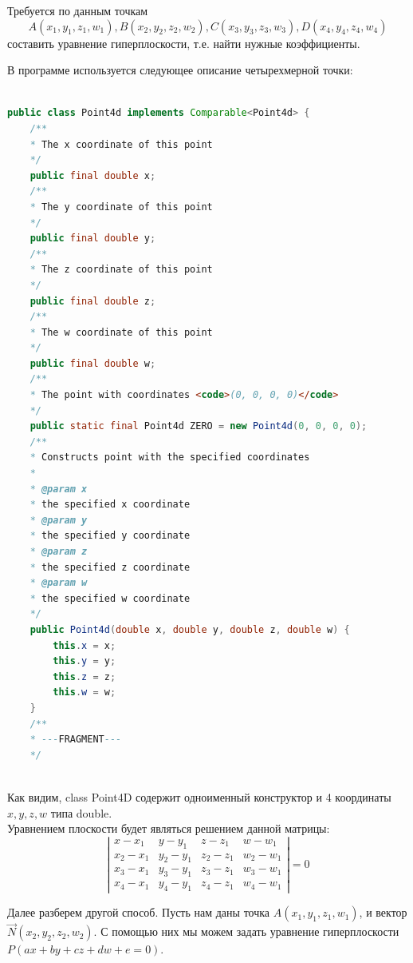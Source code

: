 \documentclass[12pt, a4paper, twoside]{report}
\begin{document}
Требуется по данным точкам $$A(x_1,y_1,z_1,w_1), B(x_2,y_2,z_2,w_2), C(x_3,y_3,z_3,w_3), D(x_4,y_4,z_4,w_4)$$ составить уравнение гиперплоскости, т.е. найти нужные коэффициенты.

В программе используется следующее описание четырехмерной точки:
\begin{lstlisting}[language=Java, basicstyle=\small]

public class Point4d implements Comparable<Point4d> {
	/**
	* The x coordinate of this point
	*/
	public final double x;
	/**
	* The y coordinate of this point
	*/
	public final double y;
	/**
	* The z coordinate of this point
	*/
	public final double z;
	/**
	* The w coordinate of this point
	*/
	public final double w;
	/**
	* The point with coordinates <code>(0, 0, 0, 0)</code>
	*/
	public static final Point4d ZERO = new Point4d(0, 0, 0, 0);
	/**
	* Constructs point with the specified coordinates
	*
	* @param x
	* the specified x coordinate
	* @param y
	* the specified y coordinate
	* @param z
	* the specified z coordinate
	* @param w
	* the specified w coordinate
	*/
	public Point4d(double x, double y, double z, double w) {
		this.x = x;
		this.y = y;
		this.z = z;
		this.w = w;
	}
	/** 
	* ---FRAGMENT---
	*/
\end{lstlisting}
\\

Как видим, class Point4D содержит одноименный конструктор и 4 координаты $x,y,z,w$ типа double.
\\

Уравнением плоскости будет являться решением данной матрицы: $$ \left|
		\begin{array}{cccc}
			x-x_1 & y-y_1 & z-z_1 & w-w_1     \\
			x_2-x_1 & y_2-y_1 & z_2-z_1 & w_2-w_1    \\
			x_3-x_1 & y_3-y_1 & z_3-z_1 & w_3-w_1      \\
			x_4-x_1 & y_4-y_1 & z_4-z_1 & w_4-w_1 
		\end{array}
	\right|=0

$$

Далее разберем другой способ. Пусть нам даны точка $A(x_1,y_1,z_1,w_1)$, и вектор $\vec N(x_2,y_2,z_2,w_2)$. С помощью них мы можем задать уравнение гиперплоскости $P(ax + by + cz + dw + e=0)$.
\end{document}
